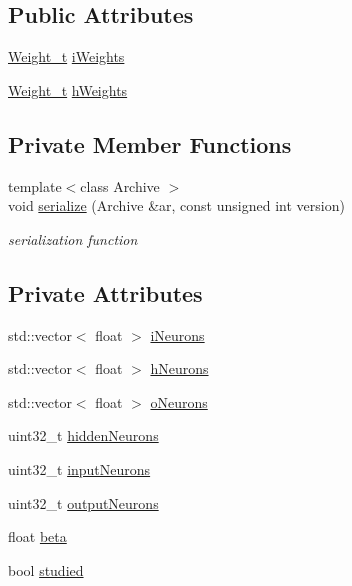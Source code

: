 \subsection*{Public Attributes}
\begin{DoxyCompactItemize}
\item 
\hyperlink{_soil_math_types_8h_ac56ad2b88186620fd0de0d213aa715dd}{Weight\+\_\+t} \hyperlink{class_soil_math_1_1_n_n_a96b0fe3caeed3d285204a6b4506075c9}{i\+Weights}
\item 
\hyperlink{_soil_math_types_8h_ac56ad2b88186620fd0de0d213aa715dd}{Weight\+\_\+t} \hyperlink{class_soil_math_1_1_n_n_a46db1b2814215509a7345fccc8928efe}{h\+Weights}
\end{DoxyCompactItemize}
\subsection*{Private Member Functions}
\begin{DoxyCompactItemize}
\item 
{\footnotesize template$<$class Archive $>$ }\\void \hyperlink{class_soil_math_1_1_n_n_a110f1834e96d352572fcf5124e1a26b0}{serialize} (Archive \&ar, const unsigned int version)
\begin{DoxyCompactList}\small\item\em serialization function \end{DoxyCompactList}\end{DoxyCompactItemize}
\subsection*{Private Attributes}
\begin{DoxyCompactItemize}
\item 
std\+::vector$<$ float $>$ \hyperlink{class_soil_math_1_1_n_n_aa5a6a6014722338fb8af2f79d6187998}{i\+Neurons}
\item 
std\+::vector$<$ float $>$ \hyperlink{class_soil_math_1_1_n_n_a459bde01ce33e0b27803cbe4a3b114b4}{h\+Neurons}
\item 
std\+::vector$<$ float $>$ \hyperlink{class_soil_math_1_1_n_n_a50a52b41982f6845dc5294f17607774b}{o\+Neurons}
\item 
uint32\+\_\+t \hyperlink{class_soil_math_1_1_n_n_aedf4b2ddaae281d83e666c308e5d67c4}{hidden\+Neurons}
\item 
uint32\+\_\+t \hyperlink{class_soil_math_1_1_n_n_a51723ae01e9b0a95c9aa6ac4f4c569fc}{input\+Neurons}
\item 
uint32\+\_\+t \hyperlink{class_soil_math_1_1_n_n_a65ce6c65168fbe7051c25dccf4bf2b0c}{output\+Neurons}
\item 
float \hyperlink{class_soil_math_1_1_n_n_a4bb773955d78fa6f064b39a9149b78c8}{beta}
\item 
bool \hyperlink{class_soil_math_1_1_n_n_aed36297c9221a837fee94f4774b614bf}{studied}
\end{DoxyCompactItemize}
